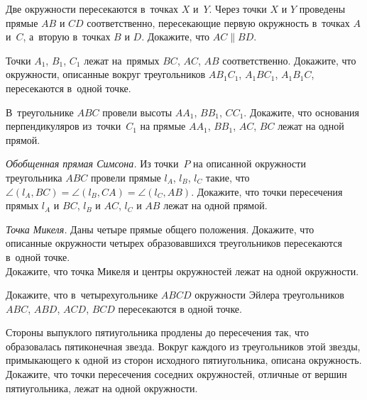 \begin{problems}

\item
Две окружности пересекаются в~точках $X$ и~$Y$.
Через точки $X$ и $Y$ проведены прямые $AB$ и $CD$ соответственно, пересекающие
первую окружность в~точках $A$ и~$C$, а~вторую в~точках $B$ и $D$.
Докажите, что $AC \parallel BD$.

\item
Точки $A_1$, $B_1$, $C_1$ лежат на~прямых $BC$, $AC$, $AB$ соответственно.
Докажите, что окружности, описанные вокруг треугольников
$A B_1 C_1$, $A_1 B C_1$, $A_1 B_1 C$, пересекаются в~одной точке.

\item
В~треугольнике $ABC$ провели высоты $A A_1$, $B B_1$, $C C_1$.
Докажите, что основания перпендикуляров из~точки~$C_1$ на прямые
$A A_1$, $B B_1$, $AC$, $BC$ лежат на одной прямой.

\item\emph{Обобщенная прямая Симсона.}
Из точки~$P$ на описанной окружности треугольника $ABC$ провели прямые
$l_A$, $l_B$, $l_C$ такие, что
$\angle (l_A, BC) = \angle (l_B, CA) = \angle (l_C, AB)$.
Докажите, что точки пересечения прямых $l_A$ и $BC$, $l_B$ и $AC$, $l_C$ и $AB$
лежат на одной прямой.

\item
\sp\emph{Точка Микеля.}
Даны четыре прямые общего положения.
Докажите, что описанные окружности четырех образовавшихся треугольников
пересекаются в~одной точке.
\\
\sp
Докажите, что точка Микеля и центры окружностей лежат на одной окружности.

\item
Докажите, что в~четырехугольнике $ABCD$ окружности Эйлера треугольников
$ABC$, $ABD$, $ACD$, $BCD$ пересекаются в одной точке.

\item
Стороны выпуклого пятиугольника продлены до пересечения так, что образовалась
пятиконечная звезда.
Вокруг каждого из треугольников этой звезды, примыкающего к одной из сторон
исходного пятиугольника, описана окружность.
Докажите, что точки пересечения соседних окружностей, отличные от вершин
пятиугольника, лежат на одной окружности.

\end{problems}

